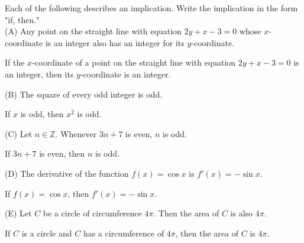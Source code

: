 \documentclass[12pt]{article}
\newcommand{\Z}{\mathbb{Z}}
\newenvironment{problem}[2][Problem]{\begin{trivlist}
		\item[\hskip \labelsep {\bfseries #1}\hskip \labelsep {\bfseries #2.}]}{\end{trivlist}}
\newenvironment{solution}[2][Solution]{\begin{trivlist}
		\item[\hskip \labelsep {\bfseries #1}\hskip \labelsep {\bfseries #2.}]}{\end{trivlist}}
\begin{document}
\begin{problem}{34}
	Each of the following describes an implication. Write the implication in the form "if, then."\\
	
	(A) Any point on the straight line with equation $2y + x -3 = 0$ whose $x$-coordinate is an integer also has an integer for its $y$-coordinate.
	\begin{solution}{a}
		If the $x$-coordinate of a point on the straight line with equation $2y + x -3 = 0$ is an integer, then its $y$-coordinate is an integer.
	\end{solution}

	(B) The square of every odd integer is odd.
	\begin{solution}{b}
		If $x$ is odd, then $x^{2}$ is odd.
	\end{solution}

	(C) Let $n \in \Z$. Whenever $3n + 7$ is even, $n$ is odd.
	\begin{solution}{c}
		If $3n+7$ is even, then $n$ is odd.
	\end{solution}

	(D) The derivative of the function $f(x) = \cos{x}$ is $f'(x) = -\sin{x}$.
	\begin{solution}{d}
		If $f(x) = \cos{x}$, then $f'(x) = -\sin{x}$.
	\end{solution}

	(E) Let $C$ be a circle of circumference $4\pi$. Then the area of $C$ is also $4\pi$.
	\begin{solution}{e}
		If $C$ is a circle and $C$ has a circumference of $4\pi$, then the area of $C$ is $4\pi$.
	\end{solution}

		      
\end{problem}
\end{document}
